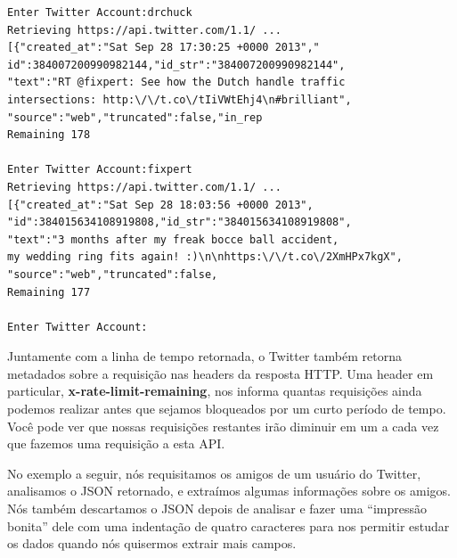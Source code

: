 \beforeverb
\begin{verbatim}
Enter Twitter Account:drchuck
Retrieving https://api.twitter.com/1.1/ ...
[{"created_at":"Sat Sep 28 17:30:25 +0000 2013","
id":384007200990982144,"id_str":"384007200990982144",
"text":"RT @fixpert: See how the Dutch handle traffic 
intersections: http:\/\/t.co\/tIiVWtEhj4\n#brilliant",
"source":"web","truncated":false,"in_rep
Remaining 178

Enter Twitter Account:fixpert
Retrieving https://api.twitter.com/1.1/ ...
[{"created_at":"Sat Sep 28 18:03:56 +0000 2013",
"id":384015634108919808,"id_str":"384015634108919808",
"text":"3 months after my freak bocce ball accident, 
my wedding ring fits again! :)\n\nhttps:\/\/t.co\/2XmHPx7kgX",
"source":"web","truncated":false,
Remaining 177

Enter Twitter Account:
\end{verbatim}
\afterverb
%
Juntamente com a linha de tempo retornada, o Twitter também 
retorna metadados sobre a requisição nas headers da resposta HTTP.
Uma header em particular, {\bf x-rate-limit-remaining}, nos 
informa quantas requisições ainda podemos realizar antes que sejamos
bloqueados por um curto período de tempo. Você pode ver que nossas
requisições restantes irão diminuir em um a cada vez que fazemos 
uma requisição a esta API.

No exemplo a seguir, nós requisitamos os amigos de um usuário do
Twitter, analisamos o JSON retornado, e extraímos algumas informações
sobre os amigos. Nós também descartamos o JSON depois de analisar e
fazer uma ``impressão bonita'' dele com uma indentação de quatro
caracteres para nos permitir estudar os dados quando nós quisermos
extrair mais campos.

